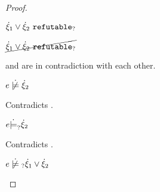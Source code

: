 \begin{proof}
\begin{byCases}
\begin{byCases}
\begin{byCases}
\begin{pfsteps*}
            \item $\dot{\xi}_1 \vee \dot{\xi}_2 ~\mathtt{refutable}_?$  
            \item $\cancel{\dot{\xi}_1 \vee \dot{\xi}_2 ~\mathtt{refutable}_?}$  
            \end{pfsteps*}
             and  are in contradiction with each other.
        \item[\text{(\ref{rule:CMSOr1})}]
            \begin{pfsteps*}
            \item $\cnotsatisfy{e}{\hxi_2}$ 
            \end{pfsteps*}
            Contradicts .
        \item[\text{(\ref{rule:CMSOr2})}]
            \begin{pfsteps*}
            \item $e \dot{\models}_{?} \dot{\xi}_2$ 
            \end{pfsteps*}
            Contradicts .
        \end{byCases}
        \begin{pfsteps*}
        \item $\cnotmaysatisfy{e}{\cor{\hxi_1}{\hxi_2}}$ 
        \end{pfsteps*}
        

\end{byCases}
\end{byCases}
\end{proof}
